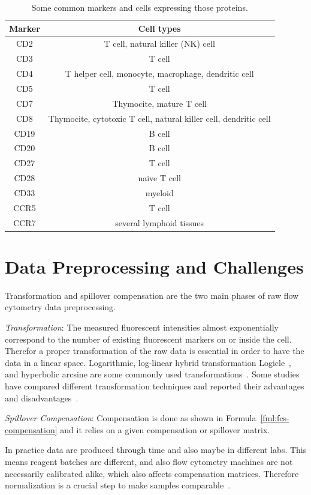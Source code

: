 \begin{table}
	\begin{tabular}{c|c}
	Marker & Cell types \\ \hline
	CD2 & T cell, natural killer (NK) cell \\
	CD3 & T cell \\
	CD4 & T helper cell, monocyte, macrophage, dendritic cell \\
	CD5 & T cell \\
	CD7 & Thymocite, mature T cell \\
	CD8 & Thymocite, cytotoxic T cell, natural killer cell, dendritic cell \\
	CD19 & B cell \\
	CD20 & B cell \\
	CD27 & T cell \\
	CD28 & naive T cell \\
	CD33 & myeloid \\
	CCR5 & T cell \\
	CCR7 & several lymphoid tissues
	\end{tabular}
	\caption{Some common markers and cells expressing those proteins.}
	\label{tbl:fcs:usual-markers}
\end{table}

\section{Data Preprocessing and Challenges}
Transformation and spillover compensation are the two main phases of raw flow cytometry data preprocessing.

\emph{Transformation}: The measured fluorescent intensities almost exponentially correspond to the number of existing fluorescent markers on or inside the cell. Therefor a proper transformation of the raw data is essential in order to have the data in a linear space. Logarithmic, log-linear hybrid transformation Logicle~\cite{fcs-logicle}, and hyperbolic arcsine are some commonly used transformations~\cite{o2013flow}. Some studies have compared different transformation techniques and reported their advantages and disadvantages~\cite{fcs-transformation-survey1, fcs-transformation-survey2}.

\emph{Spillover Compensation}: Compensation is done as shown in Formula~\ref{fml:fcs-compensation} and it relies on a given compensation or spillover matrix.

In practice data are produced through time and also maybe in different labs. This means reagent batches are different, and also flow cytometry machines are not necessarily calibrated alike, which also affects compensation matrices. Therefore normalization is a crucial step to make samples comparable~\cite{fcs-normalization}.

